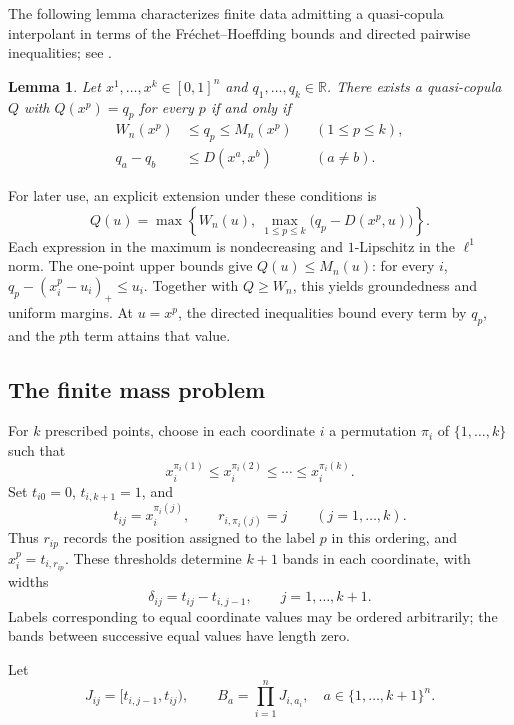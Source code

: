 \documentclass[a4paper,11pt]{amsart}
\numberwithin{equation}{section}
\newtheorem{lemma}[lemma]{Lemma}
\theoremstyle{definition}
\theoremstyle{remark}
\newcommand{\R}{\mathbb R}
\begin{document}
The following lemma characterizes finite data admitting a quasi-copula
interpolant in terms of the Fr\'echet--Hoeffding bounds and directed
pairwise inequalities; see \cite[Proposition~3.1]{OVZ}.

\begin{lemma}\label{lem:quasi}
Let $x^1,\ldots,x^k\in[0,1]^n$ and $q_1,\ldots,q_k\in\R$.
There exists a quasi-copula $Q$ with $Q(x^p)=q_p$ for every $p$ if and only if
\begin{align}
 W_n(x^p)&\leq q_p\leq M_n(x^p) &&(1\leq p\leq k),\label{eq:FH}\\
 q_a-q_b&\leq D(x^a,x^b) &&(a\ne b).\label{eq:pair}
\end{align}
\end{lemma}



For later use, an explicit extension under these conditions is
\begin{equation}
 Q(u)=\max\left\{W_n(u),\ \max_{1\leq p\leq k}
             \bigl(q_p-D(x^p,u)\bigr)\right\}.
 \label{eq:quasi-extension}
\end{equation}
Each expression in the maximum is nondecreasing and $1$-Lipschitz in the
$\ell^1$ norm. The one-point upper bounds give $Q(u)\leq M_n(u)$:
for every $i$, $q_p-(x_i^p-u_i)_+\leq u_i$.
Together with $Q\geq W_n$, this yields groundedness and uniform margins.
At $u=x^p$, the directed inequalities bound every term by $q_p$, and the
$p$th term attains that value. 

\subsection{The finite mass problem}
For $k$ prescribed points, choose in each coordinate $i$ a permutation
$\pi_i$ of $\{1,\ldots,k\}$ such that
\[
 x_i^{\pi_i(1)}\leq x_i^{\pi_i(2)}\leq\cdots\leq x_i^{\pi_i(k)}.
\]
Set $t_{i0}=0$, $t_{i,k+1}=1$, and
\[
 t_{ij}=x_i^{\pi_i(j)},\qquad r_{i,\pi_i(j)}=j
 \qquad (j=1,\ldots,k).
\]
Thus $r_{ip}$ records the position assigned to the label $p$ in this
ordering, and $x_i^p=t_{i,r_{ip}}$. These thresholds determine
$k+1$ bands in each coordinate, with widths
\[
 \delta_{ij}=t_{ij}-t_{i,j-1},
 \qquad j=1,\ldots,k+1.
\]
Labels corresponding to equal coordinate values may be ordered
arbitrarily; the bands between successive equal values have length zero.

Let
\[
 J_{ij}=[t_{i,j-1},t_{ij}),\qquad
 B_a=\prod_{i=1}^n J_{i,a_i},\quad a\in\{1,\ldots,k+1\}^n.
\]
\end{document}
